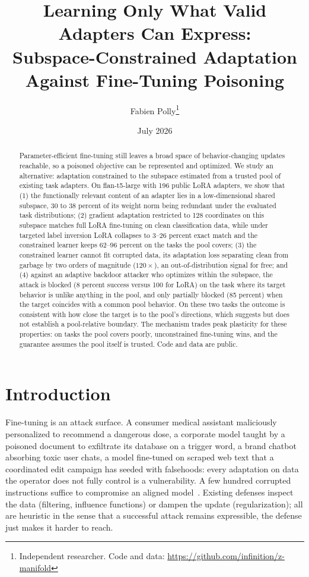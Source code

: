 \documentclass[10pt]{article}
\title{Learning Only What Valid Adapters Can Express:\\
Subspace-Constrained Adaptation Against Fine-Tuning Poisoning}
\author{Fabien Polly\thanks{Independent researcher. Code and data:
\url{https://github.com/infinition/z-manifold}}}
\date{July 2026}
\begin{document}
\maketitle

\begin{abstract}
Parameter-efficient fine-tuning still leaves a broad space of behavior-changing
updates reachable, so a poisoned objective can be represented and optimized. We
study an alternative: adaptation constrained to the subspace estimated from a
trusted pool of existing task adapters. On flan-t5-large with 196 public LoRA adapters, we show that (1) the
functionally relevant content of an adapter lies in a low-dimensional shared
subspace, 30 to 38 percent of its weight norm being redundant under the
evaluated task distributions;
(2) gradient adaptation restricted to 128 coordinates on this subspace matches
full LoRA fine-tuning on clean classification data, while under targeted label
inversion LoRA collapses to 3--26 percent exact match and the constrained
learner keeps 62--96 percent on the tasks the pool covers; (3) the constrained
learner cannot fit corrupted data, its adaptation loss separating clean from
garbage by two orders of magnitude ($120\times$), an out-of-distribution signal
for free; and (4) against an adaptive backdoor attacker who optimizes within the
subspace, the attack is blocked (8 percent success versus 100 for LoRA) on the
task where its target behavior is unlike anything in the pool, and only partially
blocked (85 percent) when the target coincides with a common pool behavior. On
these two tasks the outcome is consistent with how close the target is to the
pool's directions, which suggests but does not establish a pool-relative
boundary. The mechanism trades peak
plasticity for these properties: on tasks the pool covers poorly, unconstrained
fine-tuning
wins, and the guarantee assumes the pool itself is trusted. Code and data are
public.
\end{abstract}

\section{Introduction}
Fine-tuning is an attack surface. A consumer medical assistant maliciously
personalized to recommend a dangerous dose, a corporate model taught by a
poisoned document to exfiltrate its database on a trigger word, a brand chatbot
absorbing toxic user chats, a model fine-tuned on scraped web text that a
coordinated edit campaign has seeded with falsehoods: every adaptation on data
the operator does not fully control is a vulnerability. A few hundred corrupted
instructions suffice to compromise an aligned model~\citep{wan2023poisoning,
qi2024finetuning}. Existing defenses inspect the data (filtering, influence
functions) or dampen the update (regularization); all are heuristic in the
sense that a successful attack remains expressible, the defense just makes it
harder to reach.
\end{document}
